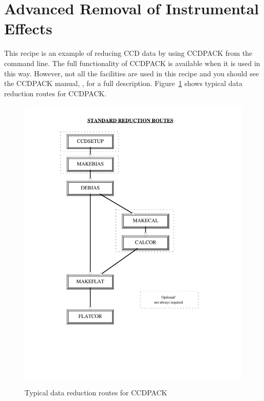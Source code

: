 \documentclass[twoside,11pt]{starlink}
\begin{document}
\newpage
\section{\label{SOLUTION}Advanced Removal of Instrumental
Effects}

This recipe is an example of reducing CCD data by using CCDPACK from
the command line.  The full functionality of CCDPACK is available when
it is used in this way.  However, not all the facilities are used in this
recipe and you should see the CCDPACK manual,
\/\cite{SUN139}, for a full description.
Figure~\ref{ROUTES} shows typical data reduction routes for CCDPACK.

\begin{figure}[htbp]
  \centering
  \includegraphics[totalheight=7in]{sc5_red}
  \begin{quote}
  \caption{Typical data reduction routes for CCDPACK
  \label{ROUTES} }
  \end{quote}
\end{figure}
\end{document}
